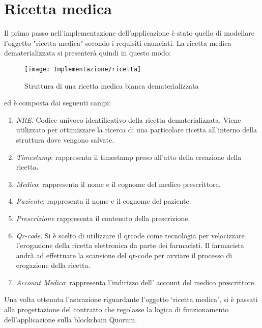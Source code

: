 \section{Ricetta medica}
%
Il primo passo nell'implementazione dell'applicazione è stato quello di modellare l'oggetto "ricetta medica" secondo i requisiti enunciati. La ricetta medica dematerializzata si presenterà quindi in questo modo:
\begin{figure}[H]
	\centering
	\texttt{[image: Implementazione/ricetta]}
	\caption{Struttura di una ricetta medica bianca dematerializzata}
	\label{fig:struttura di una ricetta medica bianca dematerializzata}
\end{figure}
ed è composta dai seguenti campi:
\begin{enumerate}
	\item \emph{NRE}. Codice univoco identificativo della ricetta dematerializzata. Viene utilizzato per ottimizzare la ricerca di una particolare ricetta all'interno della struttura dove vengono salvate.
	\item \emph{Timestamp}: rappresenta il timestamp preso all'atto della creazione della ricetta.
	\item \emph{Medico}: rappresenta il nome e il cognome del medico prescrittore.
	\item \emph{Paziente}: rappresenta il nome e il cognome del paziente.
	\item \emph{Prescrizione} rappresenta il contenuto della prescrizione.
	\item \emph{Qr-code}. Si è scelto di utilizzare il \gls{qrcode} come tecnologia per velocizzare l'erogazione della ricetta elettronica da parte dei farmacisti. Il farmacista andrà ad effettuare la scansione del qr-code per avviare il processo di erogazione della ricetta.
	\item \emph{Account Medico}: rappresenta l'indirizzo dell' account del medico prescrittore.
\end{enumerate}
Una volta ottenuta l'astrazione riguardante l'oggetto \enquote*{ricetta medica}, si è passati alla progettazione del contratto che regolasse la logica di funzionamento dell'applicazione sulla blockchain Quorum.
%
